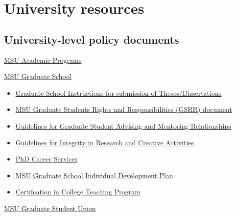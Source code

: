 \section{University resources}
\label{sec:resources}

\subsection{University-level policy documents}
\label{sec:resources_policy}


\vspace{2mm}
\noindent
\href{http://www.reg.msu.edu/ucc/ucc.asp}{MSU Academic Programs}

\vspace{2mm}
\noindent
\href{http://grad.msu.edu}{MSU Graduate School}

\begin{itemize}

\item
  \href{https://grad.msu.edu/etd}{Graduate School Instructions for submission of Theses/Dissertations}
  
\item
  \href{https://grad.msu.edu/sites/default/files/content/gsrr/GSRR.pdf}{MSU Graduate Students
  Rights and Responsibilities (GSRR) document}

\item
  \href{https://grad.msu.edu/sites/default/files/content/researchintegrity/guidelines.pdf}{Guidelines for Graduate Student Advising and Mentoring Relationships}

\item
  \href{https://grad.msu.edu/sites/default/files/content/researchintegrity/guidelines.pdf}{Guidelines for Integrity in Research and Creative Activities}

\item
  \href{https://grad.msu.edu/phdcareers}{PhD Career Services}
  
\item
  \href{http://caffe.grd.msu.edu/IDP}{MSU Graduate School Individual Development Plan}

\item
\href{https://grad.msu.edu/CCTP}{Certifcation in College Teaching Program}

\end{itemize}

\vspace{2mm}
\noindent
\href{http://geuatmsu.org/}{MSU Graduate Student Union}

